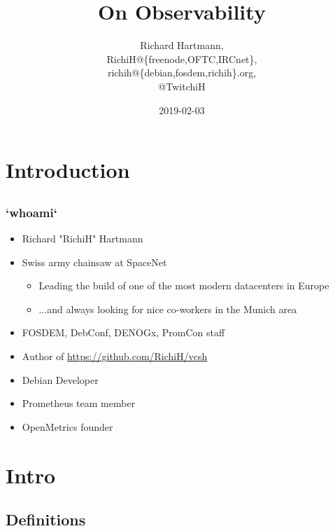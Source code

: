 \documentclass[aspectratio=169]{beamer}
\title{On Observability}
\subtitle{}
\author{Richard Hartmann,\\
RichiH@\{freenode,OFTC,IRCnet\},\\
richih@\{debian,fosdem,richih\}.org,\\
@TwitchiH}
\date{2019-02-03}
\begin{document}
\setcounter{tocdepth}{1}

\section{Introduction}

\subsection{}

\begin{frame}
	\titlepage
\end{frame}


\subsection{}

\begin{frame}
	\frametitle{`whoami`}
	\begin{itemize}
		\item Richard "RichiH" Hartmann
		\item Swiss army chainsaw at SpaceNet
		\begin{itemize}
			\item Leading the build of one of the most modern datacenters in Europe
			\item ...and always looking for nice co-workers in the Munich area
		\end{itemize}
		\item FOSDEM, DebConf, DENOGx, PromCon staff
		\item Author of \url{https://github.com/RichiH/vcsh}
		\item Debian Developer
		\item Prometheus team member
		\item OpenMetrics founder
	\end{itemize}
\end{frame}


\section{Intro}

\subsection{Definitions}
\end{document}
